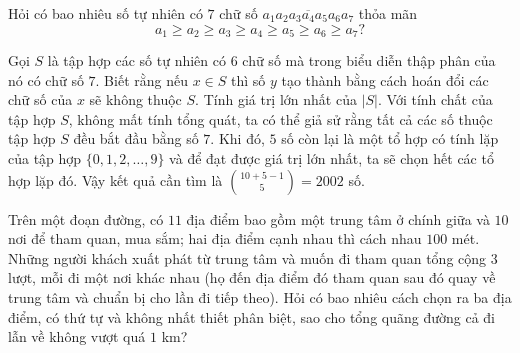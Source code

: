 \begin{bt}%
 Hỏi có bao nhiêu số tự nhiên có $7$ chữ số $\overline{a_1a_2a_3a_4a_5a_6a_7}$ thỏa mãn $$a_1\geq a_2\geq a_3\geq a_4\geq a_5\geq a_6\geq a_7?$$
 \end{bt}

\begin{bt}[Uzbekistan, 2012]%
 Gọi $S$ là tập hợp các số tự nhiên có $6$ chữ số mà trong biểu diễn thập phân của nó có chữ số $7$. Biết rằng nếu $x\in S$ thì số $y$ tạo thành bằng cách hoán đổi các chữ số của $x$ sẽ không thuộc $S$. Tính giá trị lớn nhất của $|S|$.
 \loigiai
 {
 Với tính chất của tập hợp $S$, không mất tính tổng quát, ta có thể giả sử rằng tất cả các số thuộc tập hợp $S$ đều bắt đầu bằng số $7$. Khi đó, $5$ số còn lại là một tổ hợp có tính lặp của tập hợp $\{0,1,2,\ldots ,9 \}$ và để đạt được giá trị lớn nhất, ta sẽ chọn hết các tổ hợp lặp đó. Vậy kết quả cần tìm là $\displaystyle {10+5-1\choose 5}=2002$ số.
 }
\end{bt}
 
 \begin{bt}%
 Trên một đoạn đường, có $11$ địa điểm bao gồm một trung tâm ở chính giữa và $10$ nơi để tham quan, mua sắm; hai địa điểm cạnh nhau thì cách nhau $100$ mét. Những người khách xuất phát từ trung tâm và muốn đi tham quan tổng cộng $3$ lượt, mỗi đi một nơi khác nhau (họ đến địa điểm đó tham quan sau đó quay về trung tâm và chuẩn bị cho lần đi tiếp theo). Hỏi có bao nhiêu cách chọn ra ba địa điểm, có thứ tự và không nhất thiết phân biệt, sao cho tổng quãng đường cả đi lẫn về không vượt quá $1$ km? 				
 \end{bt}

